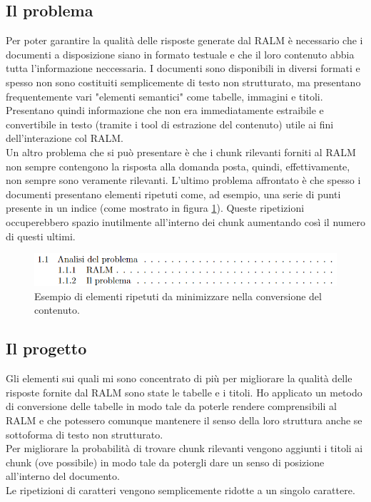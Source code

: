 \subsection{Il problema}
Per poter garantire la qualità delle risposte generate dal RALM è necessario che i documenti a disposizione siano in formato testuale e che il loro contenuto abbia tutta l'informazione 
neccessaria.
I documenti sono disponibili in diversi formati e spesso non sono costituiti semplicemente di testo non strutturato, ma presentano frequentemente vari
"elementi semantici" come tabelle, immagini e titoli.
Presentano quindi informazione che non era immediatamente estraibile e convertibile in testo (tramite i tool di estrazione del contenuto) utile ai fini dell'interazione col RALM. \\
Un altro problema che si può presentare è che i chunk rilevanti forniti al RALM non sempre contengono la risposta alla domanda posta, quindi, effettivamente, non sempre sono veramente rilevanti.
L'ultimo problema affrontato è che spesso i documenti presentano elementi ripetuti come, ad esempio, una serie di punti presente in un indice (come mostrato in figura \ref{fig:reps}).
Queste ripetizioni occuperebbero spazio inutilmente all'interno dei chunk aumentando così il numero di questi ultimi.

\begin{figure}[!h]
    \centering
    \includegraphics[width=0.8\columnwidth]{images/esempioIndice.png}
    \caption{Esempio di elementi ripetuti da minimizzare nella conversione del contenuto.}
    \label{fig:reps}
\end{figure}

\subsection{Il progetto}
Gli elementi sui quali mi sono concentrato di più per migliorare la qualità delle risposte fornite dal RALM sono state le tabelle e i titoli.
Ho applicato un metodo di conversione delle tabelle in modo tale da poterle rendere comprensibili al RALM e che potessero comunque mantenere il senso della loro struttura anche se sottoforma di testo non strutturato. \\
Per migliorare la probabilità di trovare chunk rilevanti vengono aggiunti i titoli ai chunk (ove possibile) in modo tale da potergli dare un senso di posizione all'interno del documento. \\
Le ripetizioni di caratteri vengono semplicemente ridotte a un singolo carattere.

